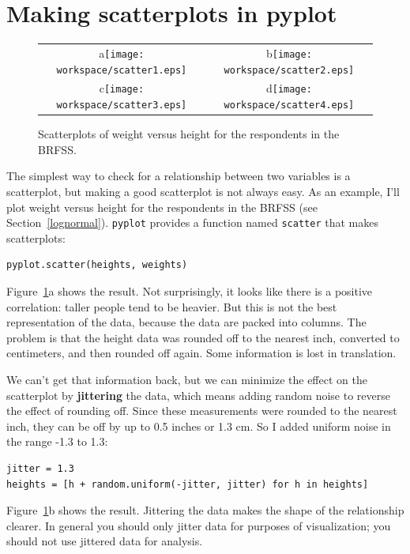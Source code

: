 \documentclass[12pt]{book}
\begin{document}
\section{Making scatterplots in pyplot}

\begin{figure}
\centering
\begin{tabular}{cc}
a\texttt{[image: workspace/scatter1.eps]} &
b\texttt{[image: workspace/scatter2.eps]} \\
c\texttt{[image: workspace/scatter3.eps]} &
d\texttt{[image: workspace/scatter4.eps]} \\ 
\end{tabular}
\caption{Scatterplots of weight versus height for the respondents
in the BRFSS.}
\label{scatterplots}
\end{figure}

The simplest way to check for a relationship between two variables
is a scatterplot, but making a good scatterplot is not always easy.
As an example, I'll plot weight versus height for the respondents
in the BRFSS (see Section~\ref{lognormal}).  {\tt pyplot} provides
a function named {\tt scatter} that makes scatterplots:

\begin{verbatim}
pyplot.scatter(heights, weights)
\end{verbatim}

Figure~\ref{scatterplots}a shows the result.  Not surprisingly, it
looks like there is a positive correlation: taller people tend to be
heavier.  But this is not the best representation of the data, because
the data are packed into columns.  The problem is that the height data
was rounded off to the nearest inch, converted to centimeters, and
then rounded off again.  Some information is lost in translation.

We can't get that information back, but we can minimize the effect on
the scatterplot by {\bf jittering} the data, which means adding random
noise to reverse the effect of rounding off.  Since these measurements
were rounded to the nearest inch, they can be off by up to 0.5 inches or
1.3 cm.  So I added uniform noise in the range -1.3 to 1.3:

\begin{verbatim}
jitter = 1.3
heights = [h + random.uniform(-jitter, jitter) for h in heights]
\end{verbatim}

Figure~\ref{scatterplots}b shows the result.  Jittering the data makes
the shape of the relationship clearer.  In general you should only jitter
data for purposes of visualization; you should not use jittered data
for analysis.
\end{document}
